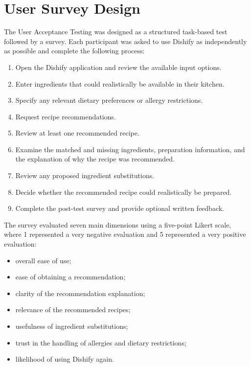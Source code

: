 \section{User Survey Design}

The User Acceptance Testing was designed as a structured task-based test
followed by a survey. Each participant was asked to use Dishify as independently
as possible and complete the following process:

\begin{enumerate}
    \item Open the Dishify application and review the available input options.
    \item Enter ingredients that could realistically be available in their kitchen.
    \item Specify any relevant dietary preferences or allergy restrictions.
    \item Request recipe recommendations.
    \item Review at least one recommended recipe.
    \item Examine the matched and missing ingredients, preparation information,
          and the explanation of why the recipe was recommended.
    \item Review any proposed ingredient substitutions.
    \item Decide whether the recommended recipe could realistically be prepared.
    \item Complete the post-test survey and provide optional written feedback.
\end{enumerate}

The survey evaluated seven main dimensions using a five-point Likert scale,
where 1 represented a very negative evaluation and 5 represented a very positive
evaluation:

\begin{itemize}
    \item overall ease of use;
    \item ease of obtaining a recommendation;
    \item clarity of the recommendation explanation;
    \item relevance of the recommended recipes;
    \item usefulness of ingredient substitutions;
    \item trust in the handling of allergies and dietary restrictions;
    \item likelihood of using Dishify again.
\end{itemize}

